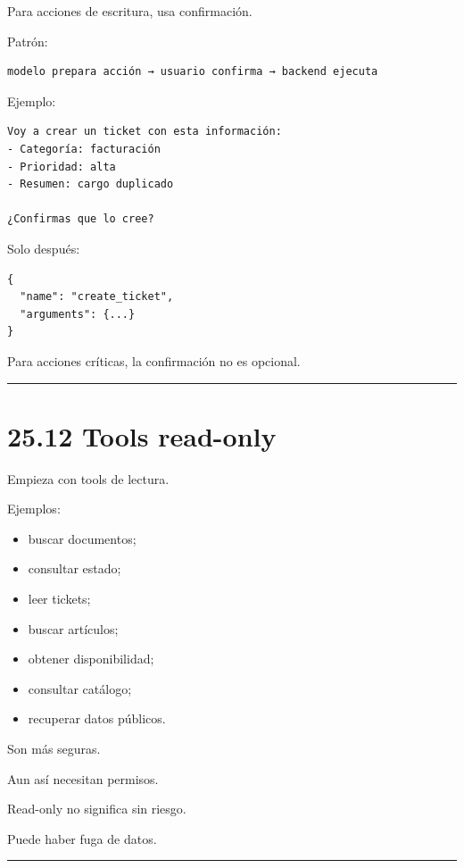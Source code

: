 Para acciones de escritura, usa confirmación.

Patrón:

\begin{lstlisting}
modelo prepara acción → usuario confirma → backend ejecuta
\end{lstlisting}

Ejemplo:

\begin{lstlisting}
Voy a crear un ticket con esta información:
- Categoría: facturación
- Prioridad: alta
- Resumen: cargo duplicado

¿Confirmas que lo cree?
\end{lstlisting}

Solo después:

\begin{lstlisting}
{
  "name": "create_ticket",
  "arguments": {...}
}
\end{lstlisting}

Para acciones críticas, la confirmación no es opcional.

\begin{center}\rule{0.5\linewidth}{0.5pt}\end{center}

\section{25.12 Tools read-only}\label{tools-read-only}

Empieza con tools de lectura.

Ejemplos:

\begin{itemize}
\tightlist
\item
  buscar documentos;
\item
  consultar estado;
\item
  leer tickets;
\item
  buscar artículos;
\item
  obtener disponibilidad;
\item
  consultar catálogo;
\item
  recuperar datos públicos.
\end{itemize}

Son más seguras.

Aun así necesitan permisos.

Read-only no significa sin riesgo.

Puede haber fuga de datos.

\begin{center}\rule{0.5\linewidth}{0.5pt}\end{center}

